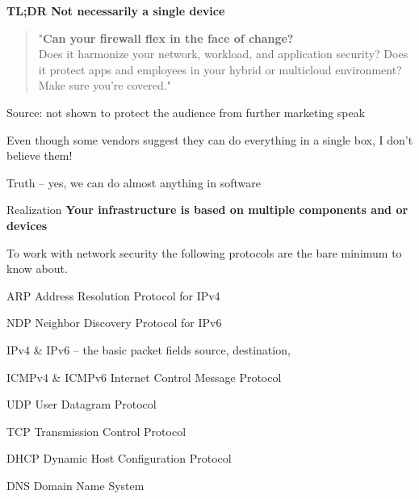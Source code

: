 \documentclass[Screen16to9,17pt]{foils}
\begin{document}
{\bf TL;DR Not necessarily a single device}




\begin{quote}
"{\bf Can your firewall flex in the face of change?}\\
Does it harmonize your network, workload, and application security? Does it protect apps and employees in your hybrid or multicloud environment? Make sure you're covered."
\end{quote}
Source: not shown to protect the audience from further marketing speak



\begin{list2}
\item Even though some vendors suggest they can do everything in a single box, I don't believe them!
\item Truth -- yes, we can do almost anything in software
\item Realization {\bf Your infrastructure is based on multiple components and or devices}
\end{list2}



To work with network security the following protocols are the bare minimum to know about.

\begin{list2}
\item ARP Address Resolution Protocol for IPv4
\item NDP Neighbor Discovery Protocol for IPv6
\item IPv4 \& IPv6 -- the basic packet fields source, destination,
\item ICMPv4 \& ICMPv6 Internet Control Message Protocol
\item UDP User Datagram Protocol
\item TCP Transmission Control Protocol
\item DHCP Dynamic Host Configuration Protocol
\item DNS Domain Name System
\end{list2}
\end{document}
